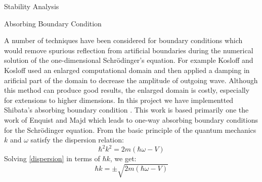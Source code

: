 \begin{homeworkProblem}
\begin{homeworkSection}{Stability Analysis}
\end{homeworkSection}

\begin{homeworkSection}{Absorbing Boundary Condition}

A number of techniques have been considered for boundary conditions which would remove spurious reflection from artificial boundaries during the numerical solution of the one-dimensional Schr\"odinger's equation. For example Kosloff and Kosloff \cite{kosloff} used an enlarged computational domain and then applied a damping in arificial part of the domain to decrease the amplitude of outgoing wave. Although this method can produce good results, the enlarged domain is costly, especially for extensions to higher dimensions. In this project we have implementted Shibata's absorbing boundary condition \cite{shibata}. This work is based primarily one the work of Enquist and Majd \cite{majd} which leads to one-way absorbing boundary conditions for the Schr\"odinger equation. From the basic principle of the quantum mechanics $k$ and $\omega$ satisfy the dispersion relation:
\begin{equation}\label{dispersion}
\hbar^2k^2=2m\left( \hbar\omega-V\right)
\end{equation}
Solving \eqref{dispersion} in terms of $\hbar k$, we get:
\begin{equation}\label{oneway}
\hbar k=\pm\sqrt{2m(\hbar\omega -V)}
\end{equation}


\end{homeworkSection}
\end{homeworkProblem}
